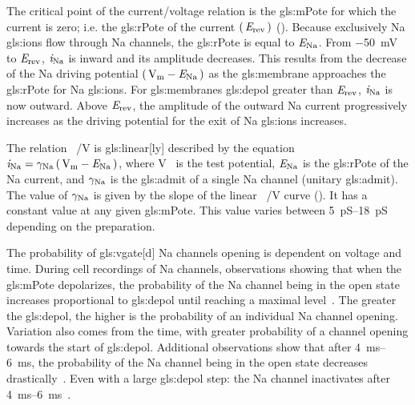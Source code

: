 \documentclass[class={myRUCProject}, crop=false]{standalone}
\begin{document}
The critical point of the current/voltage relation is the \gls{gls:mPote} for which the current is zero; i.e. the \gls{gls:rPote} of the current \(\left(\,\mathit{E}_\mathrm{rev}\,\right)\) (\textbf{}). 
Because exclusively \gls{Na} \glspl{gls:ion} flow through \gls{Na} channels, the \gls{gls:rPote} is equal to \(\mathit{E}_\mathrm{Na}\). 
From \qty{-50}{\mV} to \(\mathit{E}_\mathrm{rev}\), \(\mathit{i}_\mathrm{Na}\) is inward and its amplitude decreases. This results from the decrease of the \gls{Na} driving potential \(\br{\unit{\V\membrane}-\equi\sodium}\) as the \gls{gls:membrane} approaches the \gls{gls:rPote} for \gls{Na} \glspl{gls:ion}. 
For \glspl{gls:membrane} \gls{gls:depol} greater than \(\mathit{E}_\mathrm{rev}\), \(\mathit{i}_\mathrm{Na}\) is now outward. Above \(\mathit{E}_\mathrm{rev}\), the amplitude of the outward \gls{Na} current progressively increases as the driving potential for the exit of \gls{Na} \glspl{gls:ion} increases. 

The relation \unit[per-mode = symbol]{\ucur\sodium\per\V} is \gls{gls:linear}[ly] described by the equation \(\ucur\sodium = \ucon\sodium \br{\unit{\V\membrane}-\equi\sodium}\), where \unit{\V\membrane} is the test potential, \(\mathit{E}_\mathrm{Na}\) is the \gls{gls:rPote} of the \gls{Na} current, and \(\gamma_\mathrm{Na}\) is the \gls{gls:admit} of a single \gls{Na} channel (unitary \gls{gls:admit}). The value of \(\gamma_\mathrm{Na}\) is given by the slope of the linear \unit[per-mode = symbol]{\ucur\sodium\per\V} curve (\textbf{}). It has a constant value at any given \gls{gls:mPote}. This value varies between \qtyrange{5}{18}{\pico\siemens} depending on the preparation.

 
The probability of \gls{gls:vgate}[d] \gls{Na} channels opening is dependent on voltage and time. During cell recordings of \gls{Na} channels, observations showing that when the \gls{gls:mPote} depolarizes, the probability of the \gls{Na} channel being in the open state increases proportional to \gls{gls:depol} until reaching a maximal level~\cite{Hammond2015ch4}. 
The greater the \gls{gls:depol}, the higher is the probability of an individual \gls{Na} channel opening. 
Variation also comes from the time, with greater probability of a channel opening towards the start of \gls{gls:depol}.
Additional observations show that after \qtyrange{4}{6}{\ms}, the probability of the \gls{Na} channel being in the open state decreases drastically~\cite{Hammond2015ch4}. 
Even with a large \gls{gls:depol} step: the \gls{Na} channel inactivates after \qtyrange{4}{6}{\ms}~\cite{Hammond2015ch4}. 
\end{document}
